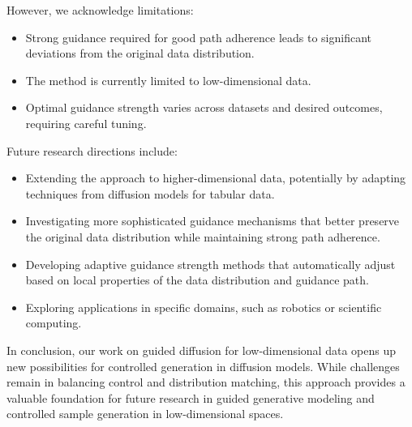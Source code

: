\documentclass{article} %
\begin{document}
However, we acknowledge limitations:

\begin{itemize}
    \item Strong guidance required for good path adherence leads to significant deviations from the original data distribution.
    \item The method is currently limited to low-dimensional data.
    \item Optimal guidance strength varies across datasets and desired outcomes, requiring careful tuning.
\end{itemize}

Future research directions include:

\begin{itemize}
    \item Extending the approach to higher-dimensional data, potentially by adapting techniques from diffusion models for tabular data.
    \item Investigating more sophisticated guidance mechanisms that better preserve the original data distribution while maintaining strong path adherence.
    \item Developing adaptive guidance strength methods that automatically adjust based on local properties of the data distribution and guidance path.
    \item Exploring applications in specific domains, such as robotics or scientific computing.
\end{itemize}

In conclusion, our work on guided diffusion for low-dimensional data opens up new possibilities for controlled generation in diffusion models. While challenges remain in balancing control and distribution matching, this approach provides a valuable foundation for future research in guided generative modeling and controlled sample generation in low-dimensional spaces.



\end{document}
